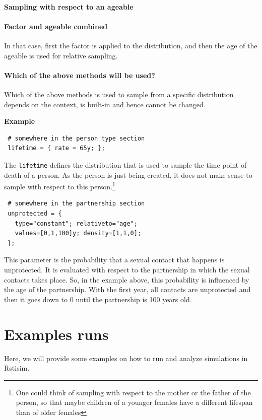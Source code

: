 \documentclass[11pt]{article}
\newenvironment{example}{\par\smallskip\noindent\begingroup\small\textbf{\small Example\enskip}}{\endgroup\par\smallskip}
\begin{document}
\paragraph{Sampling with respect to an ageable}

\paragraph{Factor and ageable combined}

In that case, first the factor is applied to the distribution, and then the age
of the ageable is used for relative sampling.

\paragraph{Which of the above methods will be used?}

Which of the above methods is used to sample from a specific
distribution depends on the context, is built-in and hence cannot be changed.
\begin{example}
\begin{verbatim}
 # somewhere in the person type section
 lifetime = { rate = 65y; };
\end{verbatim}
The \texttt{lifetime} defines the distribution that is used to sample the time
point of death of a person. As the person is just being created, it does not
make sense to sample with respect to this person.\footnote{One could think of
sampling with respect to the mother or the father of the person, so that maybe
children of a younger females have a different lifespan than of older females}

\begin{verbatim}
 # somewhere in the partnership section
 unprotected = { 
   type="constant"; relativeto="age";
   values=[0,1,100]y; density=[1,1,0];
 };
\end{verbatim}
This parameter is the probability that a sexual contact that happens is
unprotected. It is evaluated with respect to the partnership in which the
sexual contacts takes place. So, in the example above, this probability is
influenced by the age of the partnership. With the first year, all contacts are
unprotected and then it goes down to 0 until the partnership is 100 years old.
\end{example}

\section{Examples runs}
\label{ch:examples}
Here, we will provide some examples on how to run and analyze simulations in Rstisim.
\end{document}
